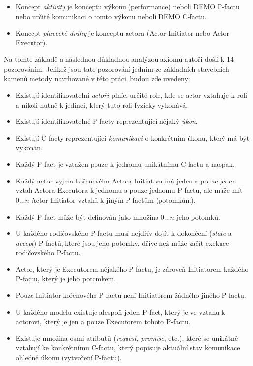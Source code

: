 \begin{itemize}
\item Koncept \textit{aktivity} je  konceptu výkonu (performance) neboli DEMO P-factu nebo určité komunikaci o tomto výkonu neboli DEMO C-factu.
\item Koncept \textit{plavecké dráhy} je  konceptu actora (Actor-Initiator nebo Actor-Executor).
\end{itemize}

Na tomto základě a následnou důkladnou analýzou axiomů \ptheory{} autoři došli k 14 pozorováním. Jelikož jsou tato pozorování jedním ze základních stavebních kamenů metody navrhované v této práci, budou zde uvedeny:

\begin{itemize}
\item Existují identifikovatelní \textit{actoři} plnící určité role, kde se actor vztahuje k roli a nikoli nutně k jedinci, který tuto roli fyzicky vykonává.
\item Existují identifikovatelné P-facty reprezentující nějaký \textit{úkon}.
\item Existují C-facty reprezentující \textit{komunikaci} o konkrétním úkonu, který má být vykonán.
\item Každý P-fact je vztažen pouze k jednomu unikátnímu C-factu a naopak.
\item Každý actor vyjma kořenového Actora-Initiatora má jeden a pouze jeden vztah Actora-Executora k jednomu a pouze jednomu P-factu, ale může mít $0...n$ Actor-Initiator vztahů k jiným P-factům (potomkům).
\item Každý P-fact může být definován jako množina $0...n$ jeho potomků. %
\item U každého rodičovského P-factu musí nejdřív dojít k dokončení (\textit{state} a \textit{accept}) P-factů, které jsou jeho potomky, dříve než může začít exekuce rodičovského P-factu.
\item Actor, který je Executorem nějakého P-factu, je zároveň Initiatorem každého P-factu, který je jeho potomkem.
\item Pouze Initiator kořenového P-factu není Initiatorem žádného jiného P-factu.
\item U každého modelu existuje alespoň jeden P-fact, který je ve vztahu k actorovi, který je jen a pouze Executorem tohoto P-factu.
\item Existuje množina osmi atributů (\textit{request}, \textit{promise}, etc.), které se unikátně vztahují ke konkrétnímu C-factu, který  popisuje aktuální stav komunikace ohledně úkonu (vytvoření P-factu).
\end{itemize}


